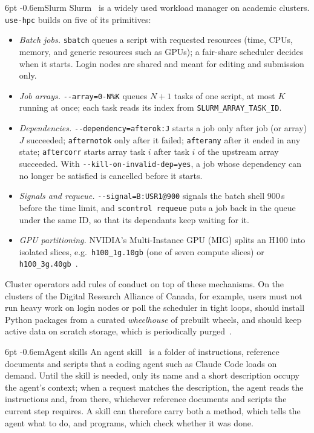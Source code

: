 \documentclass[pdflatex,sn-mathphys-num]{sn-jnl}
\makeatletter
\theoremstyle{thmstyletwo}%
\theoremstyle{thmstylethree}%
\newcommand{\tool}{\texttt{use-hpc}}
\newcommand{\code}[1]{\texttt{#1}}
\renewcommand\paragraph{\@startsection{paragraph}{4}{\z@}%
  {6pt \@plus 2pt \@minus 1pt}{-0.6em}{\normalfont\normalsize\bfseries}}
\makeatother
\begin{document}
\paragraph{Slurm} Slurm~\cite{yoo2003slurm} is a widely used workload manager on academic clusters. \tool{} builds on five of its primitives:
\begin{itemize}[leftmargin=1.4em, itemsep=1pt]
\item \emph{Batch jobs.} \code{sbatch} queues a script with requested resources (time, CPUs, memory, and generic resources such as GPUs); a fair-share scheduler decides when it starts. Login nodes are shared and meant for editing and submission only.
\item \emph{Job arrays.} \code{-{}-array=0-N\%K} queues $N{+}1$ tasks of one script, at most $K$ running at once; each task reads its index from \code{SLURM\_ARRAY\_TASK\_ID}.
\item \emph{Dependencies.} \code{-{}-dependency=afterok:J} starts a job only after job (or array) $J$ succeeded; \code{afternotok} only after it failed; \code{afterany} after it ended in any state; \code{aftercorr} starts array task $i$ after task $i$ of the upstream array succeeded. With \code{-{}-kill-on-invalid-dep=yes}, a job whose dependency can no longer be satisfied is cancelled before it starts.
\item \emph{Signals and requeue.} \code{-{}-signal=B:USR1@900} signals the batch shell 900\,s before the time limit, and \code{scontrol requeue} puts a job back in the queue under the same ID, so that its dependants keep waiting for it.
\item \emph{GPU partitioning.} NVIDIA's Multi-Instance GPU (MIG) splits an H100 into isolated slices, e.g.\ \code{h100\_1g.10gb} (one of seven compute slices) or \code{h100\_3g.40gb}~\cite{nvidia2023mig}.
\end{itemize}
Cluster operators add rules of conduct on top of these mechanisms. On the clusters of the Digital Research Alliance of Canada, for example, users must not run heavy work on login nodes or poll the scheduler in tight loops, should install Python packages from a curated \emph{wheelhouse} of prebuilt wheels, and should keep active data on scratch storage, which is periodically purged~\cite{alliance2026docs}.

\paragraph{Agent skills} An agent skill~\cite{anthropic2025skills} is a folder of instructions, reference documents and scripts that a coding agent such as Claude Code loads on demand. Until the skill is needed, only its name and a short description occupy the agent's context; when a request matches the description, the agent reads the instructions and, from there, whichever reference documents and scripts the current step requires. A skill can therefore carry both a method, which tells the agent what to do, and programs, which check whether it was done.
\end{document}
